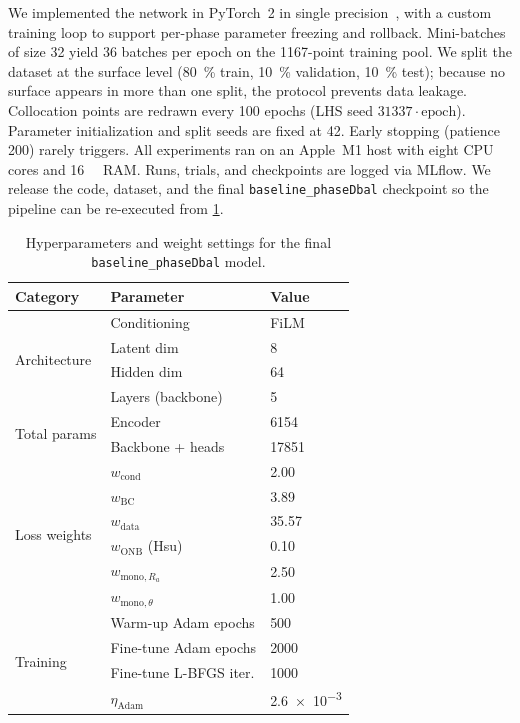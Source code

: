 We implemented the network in PyTorch~2 in single
precision~\citep{paszke2019pytorch}, with a custom training loop to
support per-phase parameter freezing and rollback. Mini-batches
of size \num{32} yield \num{36} batches per epoch on the
\num{1167}-point training pool. We split the dataset at the surface
level (\SI{80}{\percent} train, \SI{10}{\percent} validation,
\SI{10}{\percent} test); because no surface appears in more than one
split, the protocol prevents data leakage. Collocation points are redrawn every \num{100}
epochs (LHS seed $31337\cdot\text{epoch}$). Parameter initialization
and split seeds are fixed at \num{42}. Early stopping (patience
\num{200}) rarely triggers. All experiments ran on an Apple~M1 host
with eight CPU cores and \SI{16}{\giga\byte} RAM. Runs, trials, and
checkpoints are logged via MLflow. We release the code, dataset, and
the final \texttt{baseline\_phaseDbal} checkpoint so the pipeline can
be re-executed from \cref{tab:hyperparameters}.

\begin{table}[!htbp]
\caption{Hyperparameters and weight settings for the final
  \texttt{baseline\_phaseDbal} model.}
\label{tab:hyperparameters}
\small
\centering
\begin{tabular}{lll}
\hline
Category & Parameter & Value \\
\hline
\multirow{4}{*}{Architecture}
  & Conditioning      & FiLM \\
  & Latent dim        & 8 \\
  & Hidden dim        & 64 \\
  & Layers (backbone) & 5 \\
\hline
\multirow{2}{*}{Total params}
  & Encoder           & \num{6154} \\
  & Backbone + heads  & \num{17851} \\
\hline
\multirow{6}{*}{Loss weights}
  & $w_{\mathrm{cond}}$        & \num{2.00} \\
  & $w_{\mathrm{BC}}$          & \num{3.89} \\
  & $w_{\mathrm{data}}$        & \num{35.57} \\
  & $w_{\mathrm{ONB}}$ (Hsu)   & \num{0.10} \\
  & $w_{\mathrm{mono},R_a}$    & \num{2.50} \\
  & $w_{\mathrm{mono},\theta}$ & \num{1.00} \\
\hline
\multirow{4}{*}{Training}
  & Warm-up Adam epochs    & \num{500} \\
  & Fine-tune Adam epochs  & \num{2000} \\
  & Fine-tune L-BFGS iter. & \num{1000} \\
  & $\eta_{\mathrm{Adam}}$ & \num{2.6e-3} \\
\hline
\end{tabular}
\end{table}
